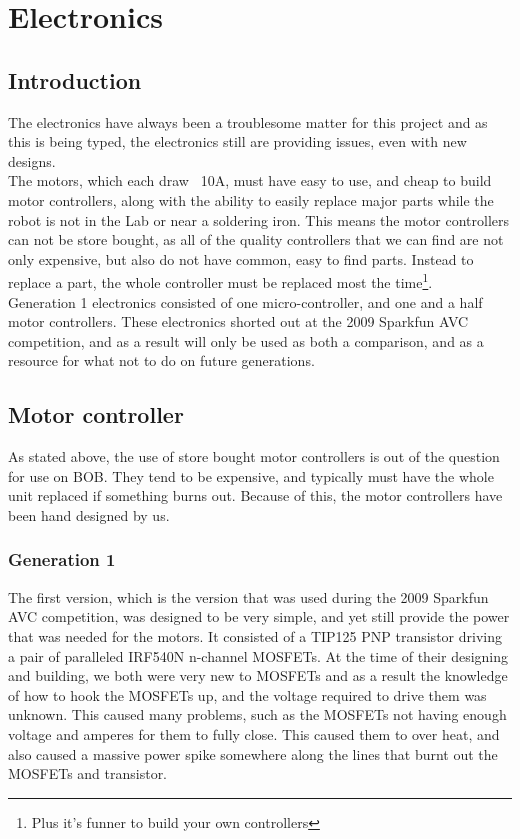 \documentclass{article}
\begin{document}
\section{Electronics}
\subsection{Introduction}
The electronics have always been a troublesome matter for this project and as this is being typed, the electronics still are providing issues, even with new designs.\\
The motors, which each draw ~10A, must have easy to use, and cheap to build motor controllers, along with the ability to easily replace major parts while the robot is not in the Lab or near a soldering iron. This means the motor controllers can not be store bought, as all of the quality controllers that we can find are not only expensive, but also do not have common, easy to find parts. Instead to replace a part, the whole controller must be replaced most the time\footnote{Plus it's funner to build your own controllers}.\\
Generation 1 electronics consisted of one micro-controller, and one and a half motor controllers. These electronics shorted out at the 2009 Sparkfun AVC competition, and as a result will only be used as both a comparison, and as a resource for what not to do on future generations.\\
\subsection{Motor controller}
As stated above, the use of store bought motor controllers is out of the question for use on BOB. They tend to be expensive, and typically must have the whole unit replaced if something burns out. Because of this, the motor controllers have been hand designed by us.\\
\subsubsection{Generation 1}
The first version, which is the version that was used during the 2009 Sparkfun AVC competition, was designed to be very simple, and yet still provide the power that was needed for the motors. It consisted of a TIP125 PNP transistor driving a pair of paralleled IRF540N n-channel MOSFETs. At the time of their designing and building, we both were very new to MOSFETs and as a result the knowledge of how to hook the MOSFETs up, and the voltage required to drive them was unknown. This caused many problems, such as the MOSFETs not having enough voltage and amperes for them to fully close. This caused them to over heat, and also caused a massive power spike somewhere along the lines that burnt out the MOSFETs and transistor.\\
\end{document}
